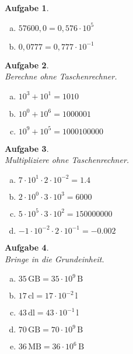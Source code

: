 \documentclass[12pt,fleqn]{article}
\theoremstyle{aufg}
\newtheorem{aufgabe}{Aufgabe}
\theoremstyle{bsp}
\begin{document}
\begin{flushleft}
\begin{aufgabe}
\begin{multicols}{3}
\begin{enumerate}[a)]
\item 
$57600,0=$$0,576\cdot10^{5}$
\item 
$0,0777=$$0,777\cdot10^{-1}$
\end{enumerate} 
\end{multicols} 
\end{aufgabe} 
\begin{aufgabe} ~ \\ 
Berechne ohne Taschenrechner. \\ 
\begin{multicols}{3} 
\begin{enumerate}[a)] 
\item 
$10^{3}+10^{1}=1010$
\item 
$10^{0}+10^{6}=1000001$
\item 
$10^{9}+10^{5}=1000100000$
\end{enumerate} 
\end{multicols} 
\end{aufgabe} 
\begin{aufgabe} ~ \\ 
Multipliziere ohne Taschenrechner. \\ 
\begin{multicols}{2} 
\begin{enumerate}[a)] 
\item 
$7\cdot10^{1}\cdot2\cdot10^{-2}=$$1.4$
\item 
$2\cdot10^{0}\cdot3\cdot10^{3}=$$6000$
\item 
$5\cdot10^{5}\cdot3\cdot10^{2}=$$150000000$
\item 
$-1\cdot10^{-2}\cdot2\cdot10^{-1}=$$-0.002$
\end{enumerate} 
\end{multicols} 
\end{aufgabe} 
\begin{aufgabe} ~ \\ 
Bringe in die Grundeinheit. \\ 
\begin{multicols}{3} 
\begin{enumerate}[a)] 
\item 
$35\,\mathrm{GB}=35\cdot 10^{9} \,\mathrm{B^{}}$
\item 
$17\,\mathrm{cl}=17\cdot 10^{-2} \,\mathrm{l^{}}$
\item 
$43\,\mathrm{dl}=43\cdot 10^{-1} \,\mathrm{l^{}}$
\item 
$70\,\mathrm{GB}=70\cdot 10^{9} \,\mathrm{B^{}}$
\item 
$36\,\mathrm{MB}=36\cdot 10^{6} \,\mathrm{B^{}}$

\end{enumerate}
\end{multicols}
\end{aufgabe}
\end{flushleft}
\end{document}
